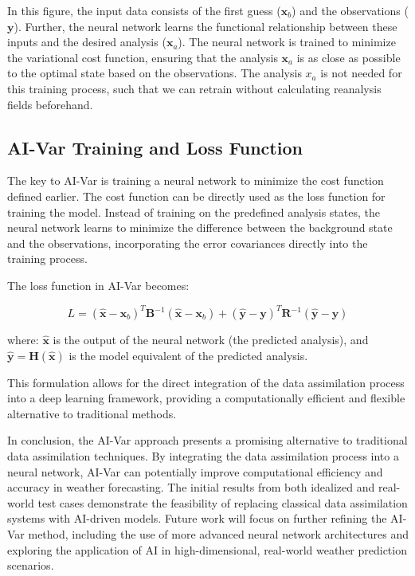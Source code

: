 In this figure, the input data consists of the first guess (\( \mathbf{x}_b \)) and the observations (\( \mathbf{y} \)). Further, the neural network learns the functional relationship between these inputs and the desired analysis (\( \mathbf{x}_a \)). The neural network is trained to minimize the variational cost function, ensuring that the analysis \( \mathbf{x}_a \) is as close as possible to the optimal state based on the observations. The analysis $x_{a}$ is not needed for this training process, such that we can retrain without calculating reanalysis fields beforehand. 


%
\subsection{AI-Var Training and Loss Function}

The key to AI-Var is training a neural network to minimize the cost function defined earlier. The cost function can be directly used as the loss function for training the model. Instead of training on the predefined analysis states, the neural network learns to minimize the difference between the background state and the observations, incorporating the error covariances directly into the training process.

The loss function in AI-Var becomes:

\[
L = (\hat{\mathbf{x}} - \mathbf{x}_b)^T \mathbf{B}^{-1} (\hat{\mathbf{x}} - \mathbf{x}_b) + (\hat{\mathbf{y}} - \mathbf{y})^T \mathbf{R}^{-1} (\hat{\mathbf{y}} - \mathbf{y})
\]

where: \( \hat{\mathbf{x}} \) is the output of the neural network (the predicted analysis), and \( \hat{\mathbf{y}} = \mathbf{H}(\hat{\mathbf{x}}) \) is the model equivalent of the predicted analysis.

This formulation allows for the direct integration of the data assimilation process into a deep learning framework, providing a computationally efficient and flexible alternative to traditional methods.


In conclusion, the AI-Var approach presents a promising alternative to traditional data assimilation techniques. By integrating the data assimilation process into a neural network, AI-Var can potentially improve computational efficiency and accuracy in weather forecasting. The initial results from both idealized and real-world test cases demonstrate the feasibility of replacing classical data assimilation systems with AI-driven models. Future work will focus on further refining the AI-Var method, including the use of more advanced neural network architectures and exploring the application of AI in high-dimensional, real-world weather prediction scenarios.



